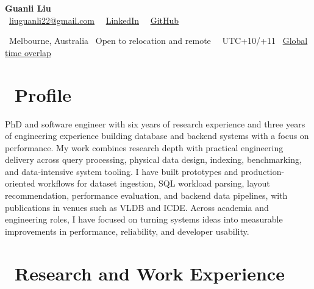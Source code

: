 \documentclass{resume}
\begin{document}

{\LARGE \textbf{Guanli Liu}}\\[-0.2em]
\faEnvelope\ \href{mailto:liuguanli22@gmail.com}{liuguanli22@gmail.com} 
\textperiodcentered\ 
\faLinkedin\ \href{https://www.linkedin.com/in/guanli-liu-11353058/}{LinkedIn} \textperiodcentered\ 
\faGithub\ \href{https://github.com/Liuguanli}{GitHub}

\faMapMarker\ Melbourne, Australia \textperiodcentered\ Open to relocation and remote \textperiodcentered\ 
\faClockO\  UTC+10/+11 \textperiodcentered\ 
\href{https://www.worldtimebuddy.com/?lid=5808079,5128581,5809844,1816670,2158177&h=2158177&hf=1}{Global time overlap \faExternalLink}
\vspace{0.4em}



\section{\faUser\ \textbf{Profile}}
PhD and software engineer with six years of research experience and three years of engineering experience building database and backend systems with a focus on performance. My work combines research depth with practical engineering delivery across query processing, physical data design, indexing, benchmarking, and data-intensive system tooling. I have built prototypes and production-oriented workflows for dataset ingestion, SQL workload parsing, layout recommendation, performance evaluation, and backend data pipelines, with publications in venues such as VLDB and ICDE. Across academia and engineering roles, I have focused on turning systems ideas into measurable improvements in performance, reliability, and developer usability.



\section{\faUsers\ \textbf{Research and Work Experience}}
\end{document}
